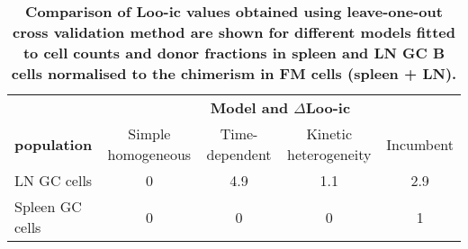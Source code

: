 \documentclass[11pt]{article}
\begin{document}
\begin{table}[h!]
	\begin{center}
		\renewcommand{\arraystretch}{1.25}
		\begin{tabular}{ l c c c c} 
			\toprule 
			& \multicolumn{4}{c}{\textbf{Model and $\Delta$Loo-ic}} \\
			\cline{2-5}
			\textbf{population}  &  {\small Simple homogeneous}   & {\small Time-dependent} &  {\small Kinetic heterogeneity} & {\small Incumbent}   \\ 
			\toprule
			LN GC cells         & 0   &  4.9  & 1.1 & 2.9   \\ 
			Spleen GC cells     & 0   &  0    & 0   & 1  \\ 			
			\hline
			\toprule 
		\end{tabular}
	\end{center}
	\caption{\small \textbf{Comparison of Loo-ic values obtained using leave-one-out cross validation method are shown for different models fitted to cell counts and donor fractions in spleen and LN GC B cells normalised to the chimerism in FM cells (spleen + LN).}} 
\label{tab:GC-AICs}
\end{table} 
\end{document}
